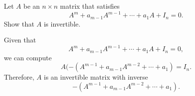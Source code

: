 \documentclass{ximera}
\begin{document}
\begin{exercise} \label{c4.8.6}
Let $A$ be an $n\times n$ matrix that satisfies
\[
A^m + a_{m-1}A^{m-1} + \cdots + a_1A + I_n = 0.
\]
Show that $A$ is invertible.

\begin{solution}

\soln
Given that
\[
A^m + a_{m - 1}A^{m - 1} + \cdots + a_1A + I_n = 0,
\]
we can compute
\[
A(-(A^{m - 1} + a_{m - 1}A^{m - 2} + \cdots + a_1) = I_n.
\]
Therefore, $A$ is an invertible matrix with inverse
\[
-(A^{m - 1} + a_{m - 1}A^{m - 2} + \cdots + a_1).
\]

\end{solution}
\end{exercise}
\end{document}
